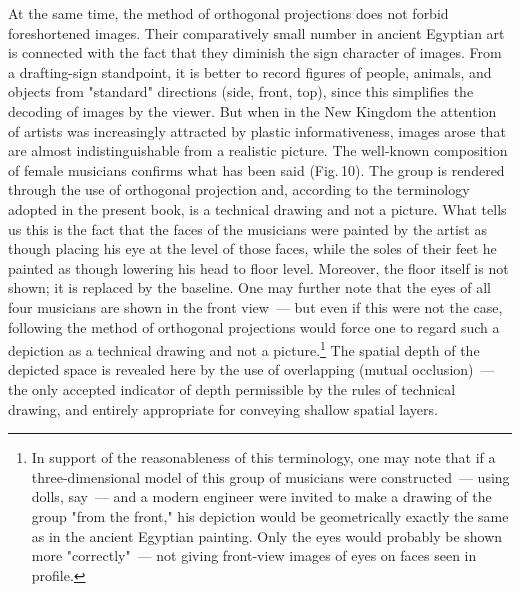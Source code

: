 At the same time, the method of orthogonal projections does not forbid foreshortened
images. Their comparatively small number in ancient Egyptian art is connected with the
fact that they diminish the sign character of images. From a drafting-sign standpoint,
it is better to record figures of people, animals, and objects from "standard" directions
(side, front, top), since this simplifies the decoding of images by the viewer. But when
in the New Kingdom the attention of artists was increasingly attracted by plastic
informativeness, images arose that are almost indistinguishable from a realistic picture.
The well-known composition of female musicians confirms what has been said (Fig.\,10).
The group is rendered through the use of orthogonal projection and, according to the
terminology adopted in the present book, is a technical drawing and not a picture. What
tells us this is the fact that the faces of the musicians were painted by the artist as
though placing his eye at the level of those faces, while the soles of their feet he painted
as though lowering his head to floor level. Moreover, the floor itself is not shown; it is
replaced by the baseline. One may further note that the eyes of all four musicians are
shown in the front view~--- but even if this were not the case, following the method of
orthogonal projections would force one to regard such a depiction as a technical drawing
and not a picture.\footnote{%
  In support of the reasonableness of this terminology, one may note that if a
  three-dimensional model of this group of musicians were constructed~--- using dolls,
  say~--- and a modern engineer were invited to make a drawing of the group "from the
  front," his depiction would be geometrically exactly the same as in the ancient
  Egyptian painting. Only the eyes would probably be shown more "correctly"~--- not
  giving front-view images of eyes on faces seen in profile.}
The spatial depth of the depicted space is revealed here by the use of overlapping
(mutual occlusion)~--- the only accepted indicator of depth permissible by the rules of
technical drawing, and entirely appropriate for conveying shallow spatial layers.



